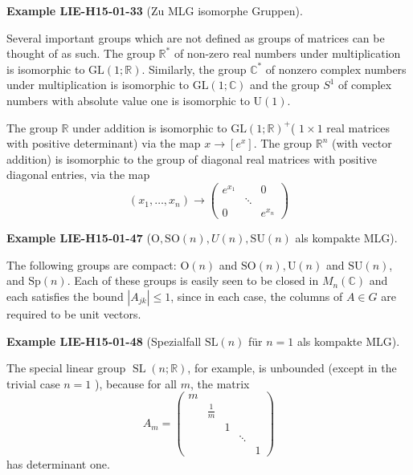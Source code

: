 \documentclass[10pt, letterpaper]{article}
\newcommand{\SL}{\mathrm{SL}}
\newcommand{\SO}{\mathrm{SO}}
\newcommand{\SU}{\mathrm{SU}}
\newcommand{\Ogroup}{\mathrm{O}} %
\newcommand{\CustomHeading}[3]{%
  \par\medskip\noindent%
  \textbf{#1 #2} \textnormal{(#3)}.\enskip%
}
\newenvironment{EXA}[2]{\CustomHeading{Example}{#1}{#2}}{}
\begin{document}
\begin{EXA}{LIE-H15-01-33}{Zu MLG isomorphe Gruppen}
Several important groups which are not defined as groups of matrices can be thought of as such. The group $\mathbb{R}^{*}$ of non-zero real numbers under multiplication is isomorphic to $\mathrm{GL}(1 ; \mathbb{R})$. Similarly, the group $\mathbb{C}^{*}$ of nonzero complex numbers under multiplication is isomorphic to $\mathrm{GL}(1 ; \mathbb{C})$ and the group $S^{1}$ of complex numbers with absolute value one is isomorphic to $\mathrm{U}(1)$.

The group $\mathbb{R}$ under addition is isomorphic to $\mathrm{GL}(1 ; \mathbb{R})^{+}$( $1 \times 1$ real matrices with positive determinant) via the map $x \rightarrow\left[e^{x}\right]$. The group $\mathbb{R}^{n}$ (with vector addition) is isomorphic to the group of diagonal real matrices with positive diagonal entries, via the map
$$
\left(x_{1}, \ldots, x_{n}\right) \rightarrow\left(\begin{array}{ccc}
e^{x_{1}} & & 0 \\
& \ddots & \\
0 & & e^{x_{n}}
\end{array}\right)
$$
\end{EXA}

\begin{EXA}{LIE-H15-01-47}{$\Ogroup, \SO(n),U(n),\SU(n)$ als kompakte MLG}
The following groups are compact: $\mathrm{O}(n)$ and $\mathrm{SO}(n), \mathrm{U}(n)$ and $\mathrm{SU}(n)$, and $\mathrm{Sp}(n)$. Each of these groups is easily seen to be closed in $M_{n}(\mathbb{C})$ and each satisfies the bound $\left|A_{j k}\right| \leq 1$, since in each case, the columns of $A \in G$ are required to be unit vectors.
\end{EXA}

\begin{EXA}{LIE-H15-01-48}{Spezialfall $\SL(n)$ für $n=1$ als kompakte MLG}
The special linear group $\operatorname{SL}(n ; \mathbb{R})$, for example, is unbounded (except in the trivial case $n=1$ ), because for all $m$, the matrix
$$
A_{m}=\left(\begin{array}{ccccc}
m & & & & \\
& \frac{1}{m} & & & \\
& & 1 & & \\
& & & \ddots & \\
& & & & 1
\end{array}\right)
$$
has determinant one.
\end{EXA}
\end{document}
